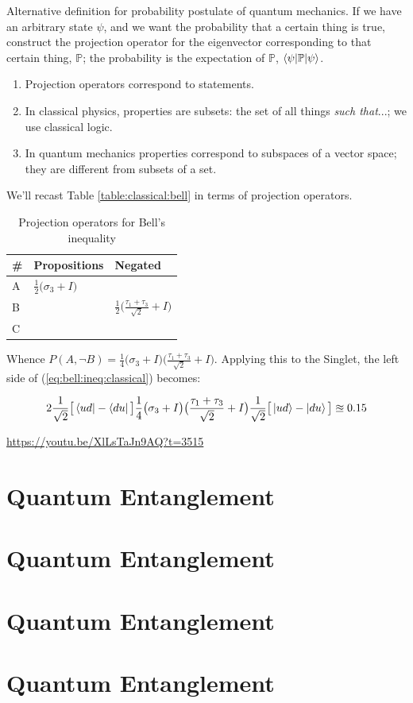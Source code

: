 \documentclass[]{article}
\begin{document}
Alternative definition  for probability postulate of quantum mechanics.
If we have an arbitrary state $\psi$, and we want the probability that a certain thing is true, construct the projection operator for the eigenvector corresponding to that certain thing, $\mathbb{P}$; the probability is the expectation of $\mathbb{P}$, $\braket{\psi|\mathbb{P}|\psi}$.

\begin{enumerate}
	\item Projection operators correspond to statements.
	\item In classical physics, properties are subsets: the set of all things \emph{such that}...; we use classical logic.
	\item In quantum mechanics properties correspond to subspaces of a vector space; they are different from subsets of a set. 
\end{enumerate}

We'll recast Table \ref{table:classical:bell} in terms of projection operators.
\begin{table}[H]
	\caption{Projection operators for Bell's inequality}
	\begin{center}
		\begin{tabular}{|l|l|l|}\hline
			\#&Propositions& Negated\\ \hline 
			A&$\frac{1}{2}\big(\sigma_3 + I\big)$&\\ \hline
			B&&$\frac{1}{2}\big(\frac{\tau_1+\tau_3}{\sqrt{2}}+I\big)$\\ \hline
			C&&\\ \hline
		\end{tabular}
	\end{center}
\end{table}
Whence $P(A, \neg B) = \frac{1}{4}\big(\sigma_3 + I\big) \big(\frac{\tau_1+\tau_3}{\sqrt{2}}+I\big)$. Applying this to the Singlet, the left side of (\ref{eq:bell:ineq:classical}) becomes:

\begin{align*}
	2 \frac{1}{\sqrt{2}}\big[\bra{ud}-\bra{du}\big]\frac{1}{4}\big(\sigma_3 + I\big) \big(\frac{\tau_1+\tau_3}{\sqrt{2}}+I\big)\frac{1}{\sqrt{2}}\big[\ket{ud}-\ket{du}\big]\approxeq 0.15
\end{align*}



\url{https://youtu.be/XlLsTaJn9AQ?t=3515}

\section{Quantum Entanglement}

\section{Quantum Entanglement}

\section{Quantum Entanglement}

\section{Quantum Entanglement}


\raggedright

\end{document}

